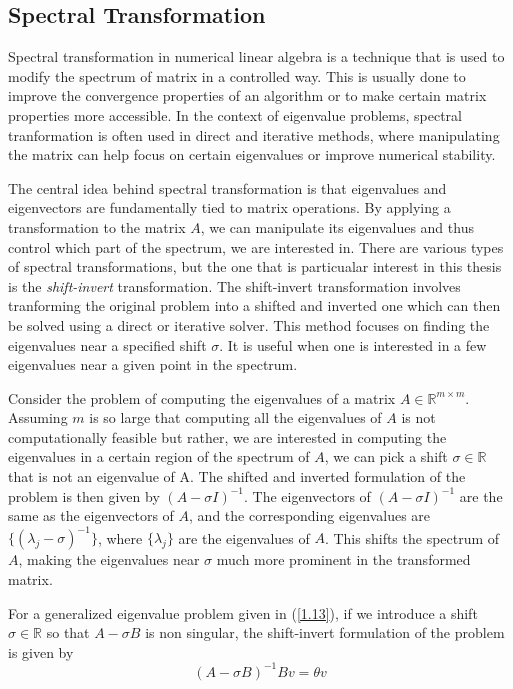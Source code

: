 \subsection{Spectral Transformation}\label{section-2.11}
Spectral transformation in numerical linear algebra is a technique that is used to modify the spectrum of matrix in a controlled way. This is usually done to improve the convergence properties of an algorithm or to make certain matrix properties more accessible. In the context of eigenvalue problems, spectral tranformation is often used in direct and iterative methods, where manipulating the matrix can help focus on certain eigenvalues or improve numerical stability.\par
The central idea behind spectral transformation is that eigenvalues and eigenvectors are fundamentally tied to matrix operations. By applying a transformation to the matrix $A$, we can manipulate its eigenvalues and thus control which part of the spectrum, we are interested in. There are various types of spectral transformations, but the one that is particualar interest in this thesis is the \textit{shift-invert} transformation. The shift-invert transformation involves tranforming the original problem into a shifted and inverted one which can then be solved using a direct or iterative solver. This method focuses on finding the eigenvalues near a specified shift $\sigma$. It is useful when one is interested in a few eigenvalues near a given point in the spectrum.\par
Consider the problem of computing the eigenvalues of a matrix $A \in \mathbb{R}^{m \times m}$. Assuming $m$ is so large that computing all the eigenvalues of $A$ is not computationally feasible but rather, we are interested in computing the eigenvalues in a certain region of the spectrum of $A$, we can pick a shift $\sigma \in \mathbb{R}$ that is not an eigenvalue of A. The shifted and inverted formulation of the problem is then given by $(A - \sigma I)^{-1}$. The eigenvectors of $(A - \sigma I)^{-1}$ are the same as the eigenvectors of $A$, and the corresponding eigenvalues are $\{ (\lambda_j - \sigma)^{-1}\}$, where $\{ \lambda_j\}$ are the eigenvalues of $A$. This shifts the spectrum of $A$, making the eigenvalues near $\sigma$ much more prominent in the transformed matrix.\par
For a generalized eigenvalue problem given in (\ref{1.13}), if we introduce a shift $\sigma \in \mathbb{R}$ so that $A - \sigma B$ is non singular, the shift-invert formulation of the problem is given by
\begin{equation}\label{st-1}
	(A - \sigma B)^{-1} Bv = \theta v
\end{equation}
